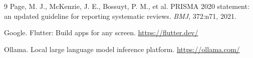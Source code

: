 \documentclass[11pt,a4paper]{article}
\begin{document}
\begin{thebibliography}{9}
Page, M. J., McKenzie, J. E., Bossuyt, P. M., et al. PRISMA 2020 statement: an updated guideline for reporting systematic reviews. \emph{BMJ}, 372:n71, 2021.

Google. Flutter: Build apps for any screen. \url{https://flutter.dev/}

Ollama. Local large language model inference platform. \url{https://ollama.com/}
\end{thebibliography}
\end{document}
